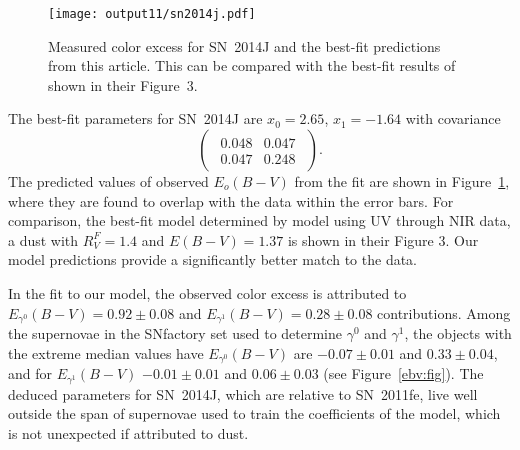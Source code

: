 \documentclass{aastex61}   	%
\begin{document}
\begin{figure}[htbp] %
   \centering
   \texttt{[image: output11/sn2014j.pdf]} 
   \caption{Measured color excess for SN~2014J and the best-fit predictions from this article. 
   \color{red}
   This can be compared with the best-fit results of
   \citet{2014ApJ...788L..21A} shown in their Figure~3.
   \color{black}
   \label{sn2014j:fig}}
\end{figure}

The best-fit parameters for SN~2014J are 
$x_0= 2.65$, $ x_1=-1.64$ with covariance
\begin{equation}
\begin{pmatrix}
\begin{array}{rr}
0.048 & 0.047 \\
0.047 & 0.248
\end{array}
\end{pmatrix}.
\end{equation}
The predicted values of observed $E_o(B-V)$ from the fit are shown in Figure~\ref{sn2014j:fig}, where they are found to
overlap with the data within the error bars.   For comparison, the best-fit model determined by  \citet{2014ApJ...788L..21A} model using
UV through NIR data,
a  \citet{1999PASP..111...63F} dust with $R_V^F=1.4$ and $E(B-V)=1.37$
\color{red}
is shown in their Figure 3.
\color{black}
Our model predictions provide a significantly better match to the data.

In the fit to our model, the observed color excess is attributed to 
$E_{\gamma^0}(B-V)=  0.92 \pm   0.08$ and  $E_{\gamma^1}(B-V)=  0.28 \pm   0.08$
contributions.
Among the supernovae in the SNfactory  set used to determine $\gamma^0$ and $\gamma^1$, the
objects with the extreme median values have 
$E_{\gamma^0}(B-V)$ are $-0.07 \pm 0.01$ and  $  0.33 \pm 0.04$,
and for $E_{\gamma^1}(B-V)$ $-0.01 \pm 0.01$  and
$  0.06 \pm 0.03$ 
(see Figure~\ref{ebv:fig}).
The deduced parameters for SN~2014J, which are relative to SN~2011fe, live well outside the 
span of supernovae used to train the coefficients of the model, which is not unexpected if
attributed to dust. 
\end{document}
